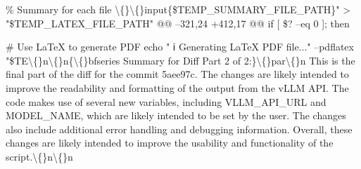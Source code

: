 \documentclass{article}
\begin{document}
{ \% Summary for each file
 \textbackslash\{\}\textbackslash\{\}input\{\$TEMP\_SUMMARY\_FILE\_PATH\}" \textgreater{} "\$TEMP\_LATEX\_FILE\_PATH"
@@ --321,24 +412,17 @@ if [ \$? --eq 0 ]; then
 
 \# Use LaTeX to generate PDF
 echo "  ℹ️ Generating LaTeX PDF file..."
--pdflatex "\$TE\textbackslash\{\}n\textbackslash\{\}n\{\textbackslash\{\}bfseries Summary for Diff Part 2 of 2:\}\textbackslash\{\}par\textbackslash\{\}n  This is the final part of the diff for the commit 5aee97c. The changes are likely intended to improve the readability and formatting of the output from the vLLM API. The code makes use of several new variables, including VLLM\_API\_URL and MODEL\_NAME, which are likely intended to be set by the user. The changes also include additional error handling and debugging information. Overall, these changes are likely intended to improve the usability and functionality of the script.\textbackslash\{\}n\textbackslash\{\}n\n}\n\n
\end{document}
